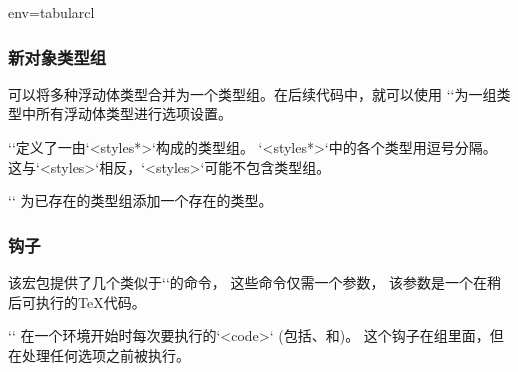 \begin{tableobject}{env=tabular}{cl}
\subsubsection{新对象类型组}
\label{new-object-style-groups}

可以将多种浮动体类型合并为一个类型组。在后续代码中，就可以使用
``为一组类型中所有浮动体类型进行选项设置。

\DescribeMacro{\NewObjectStyleGroup}
``定义了一由`<styles*>`构成的类型组。
`<styles*>`中的各个类型用逗号分隔。
这与`<styles>`相反，`<styles>`可能不包含类型组。

\DescribeMacro{\AddObjectStyleToGroup}
``
为已存在的类型组添加一个存在的类型。


\subsubsection{钩子}
\label{hooks}

该宏包提供了几个类似于`\AtBeginDocument`的命令，
这些命令仅需一个参数，
该参数是一个在稍后可执行的\TeX{}代码。


\DescribeMacro{\AtBeginObject}
``
  在一个环境开始时每次要执行的`<code>`
  (包括、和)。
  这个钩子在组里面，但在处理任何选项之前被执行。


\end{tableobject}
